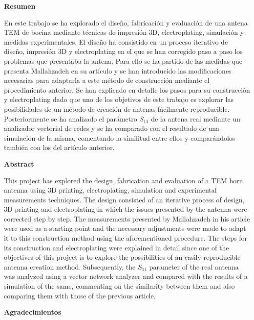 \documentclass[11pt,a4paper,twoside,pdf]{article}
\numberwithin{equation}{section}
\begin{document}
\newpage
%
\begin{center}
{\bf Resumen}
\bigskip

\begin{minipage}{0.8\linewidth}
En este trabajo se ha explorado el diseño, fabricación y evaluación de una antena TEM de bocina mediante técnicas de impresión 3D, electroplating, simulación y medidas experimentales. El diseño ha consistido en un proceso iterativo de diseño, impresión 3D y electroplating en el que se han corregido paso a paso los problemas que presentaba la antena. Para ello se ha partido de las medidas que presenta Mallahzadeh en su artículo \cite{tem_horn} y se han introducido las modificaciones necesarias para adaptarla a este método de construcción mediante el procedimiento anterior. Se han explicado en detalle los pasos para su construcción y electroplating dado que uno de los objetivos de este trabajo es explorar las posibilidades de un método de creación de antenas fácilmente reproducible. Posteriormente se ha analizado el parámetro $S_{11}$ de la antena real mediante un analizador vectorial de redes y se ha comparado con el resultado de una simulación de la misma, comentando la similitud entre ellos y comparándolos también con los del artículo anterior.
\end{minipage}

\vfill

{\bf Abstract} 
\bigskip

\begin{minipage}{0.8\linewidth}
This project has explored the design, fabrication and evaluation of a TEM horn antenna using 3D printing, electroplating, simulation and experimental measurements techniques. The design consisted  of an iterative process of design, 3D printing and electroplating in which the issues presented by the antenna were corrected step by step. The measurements presented by Mallahzadeh in his article \cite{tem_horn} were used as a starting point and the necessary adjustments were made to adapt it to this construction method using the aforementioned procedure. The steps for its construction and electroplating were explained in detail since one of the objectives of this project is to explore the possibilities of an easily reproducible antenna creation method. Subsequently, the $S_{11}$ parameter of the real antenna was analyzed using a vector network analyzer and compared with the results of a simulation of the same, commenting on the similarity between them and also comparing them with those of the previous article.
\end{minipage}
\newpage
{\bf Agradecimientos}
\bigskip


\end{center}
\end{document}
